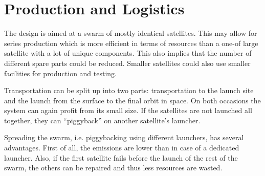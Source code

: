 \section{Production and Logistics}
\label{SSPRO}

The design is aimed at a swarm of mostly identical satellites. This may allow for series production which is more efficient in terms of resources than a one-of large satellite with a lot of unique components. This also implies that the number of different spare parts could be reduced. Smaller satellites could also use smaller facilities for production and testing. 

Transportation can be split up into two parts: transportation to the launch site and the launch from the surface to the final orbit in space. On both occasions the system can again profit from its small size. If the satellites are not launched all together, they can ``piggyback'' on another satellite's launcher.

Spreading the swarm, i.e. piggybacking using different launchers, has several advantages. First of all, the emissions are lower than in case of a dedicated launcher. Also, if the first satellite fails before the launch of the rest of the swarm, the others can be repaired and thus less resources are wasted.